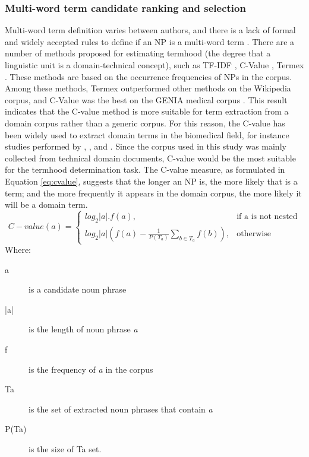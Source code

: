 \documentclass[Journal, BackFigs, DoubleSpace]{ascelike}%
\begin{document}
\subsubsection{Multi-word term candidate ranking and selection} 
%
Multi-word term definition varies between authors, and there is a lack of formal and widely accepted rules to define if an NP is a multi-word term \cite{frantzi20}. There are a number of methods proposed for estimating termhood (the degree that a linguistic unit is a domain-technical concept), such as TF-IDF \cite{sparck72,salton88}, C-Value \cite{frantzi20}, Termex  \cite{sclano07}. These methods are based on the occurrence frequencies of NPs in the corpus. Among these methods, Termex outperformed other methods on the Wikipedia corpus, and C-Value was the best on the GENIA medical corpus \cite{zhang08}. This result indicates that the C-value method is more suitable for term extraction from a domain corpus rather than a generic corpus. For this reason, the C-value has been widely used to extract domain terms in the biomedical field, for instance studies performed by , , and . Since the corpus used in this study was mainly collected from technical domain documents, C-value would be the most suitable for the termhood determination task. The C-value measure, as formulated in Equation \ref{eq:cvalue}, suggests that the longer an NP is, the more likely that is a term; and the more frequently it appears in the domain corpus, the more likely it will be a domain term.
	\begin{equation}
	C-value(a)=
	\begin{cases}
	log_2|a|.f(a), & \text{if a is not nested} \\
	log_2|a|(f(a)-\frac{1}{P(T_a)}\sum_{b\in T_a} f(b)), & \text{otherwise}
	\end{cases}
	\label{eq:cvalue}
	\end{equation}
	Where:
	\begin{description}
		\item[a] is a candidate noun phrase
		\item[|a|] is the length of noun phrase \textit{a}
		\item[f] is the frequency of \textit{a} in the corpus
		\item[Ta] is the set of extracted noun phrases that contain \textit{a}
		\item[P(Ta)] is the size of Ta set.
	\end{description}
\end{document}
